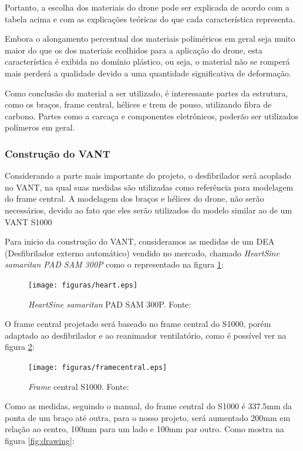 Portanto, a escolha dos materiais do drone pode ser explicada de acordo com a tabela acima e com as explicações teóricas do que cada característica representa. 

Embora o alongamento percentual dos materiais poliméricos em geral seja muito maior do que os dos materiais ecolhidos para a aplicação do drone, esta característica é exibida no domínio plástico, ou seja, o material não se romperá mais perderá a qualidade devido a uma quantidade significativa de deformação.

Como conclusão do material a ser utilizado, é interessante partes da estrutura, como os braços, frame central, hélices e trem de pouso, utilizando fibra de carbono. Partes como a carcaça e componentes eletrônicos, poderão ser utilizados polímeros em geral. 

\subsubsection{Construção do VANT}

Considerando a parte mais importante do projeto, o desfibrilador será acoplado no VANT, na qual suas medidas são utilizadas como referência para modelagem do frame central.  A modelagem dos braços e hélices do drone,  não serão necessários, devido ao fato que eles serão utilizados do modelo similar ao de um VANT S1000

Para inicio da construção do VANT, consideramos as medidas de um DEA (Desfibrilador externo automático) vendido no mercado, chamado \textit{HeartSine samaritan PAD SAM 300P}  como o representado na figura \ref{fig:heart}:

\begin{figure}[H]
    \centering
      \texttt{[image: figuras/heart.eps]}
    \caption{ \textit{HeartSine samaritan} PAD SAM 300P. Fonte: \cite{aedsingapore}}
    \label{fig:heart}
\end{figure}

O frame central projetado será baseado no frame central do S1000, porém adaptado ao desfibrilador e ao reanimador ventilatório, como é possível 
ver na figura \ref{fig:framecentral}: 

\begin{figure}[H]
    \centering
      \texttt{[image: figuras/framecentral.eps]}
    \caption{ \textit{Frame} central S1000. Fonte: \cite{heliguy}}
    \label{fig:framecentral}
\end{figure}


Como as medidas, seguindo o manual, do frame central do S1000 é 337.5mm da ponta de um braço até outra, para o nosso projeto, será aumentado  200mm em relação ao centro, 100mm para um lado e 100mm par outro. Como mostra na figura \ref{fig:drawing}:

